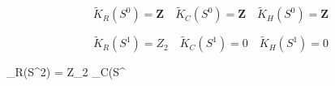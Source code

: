 $$\tilde{K}_R(S^0) = \mathbf{Z} \quad \tilde{K}_C(S^0) = \mathbf{Z} \quad \tilde{K}_H(S^0) = \mathbf{Z}$$

$$\tilde{K}_R(S^1) = Z_2 \quad \tilde{K}_C(S^1) = 0 \quad \tilde{K}_H(S^1) = 0$$

$$_R(S^2) = Z_2 \quad {}_C(S^
